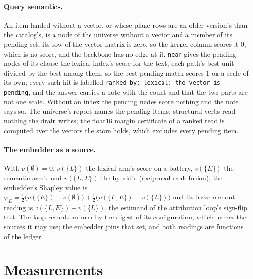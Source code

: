 \documentclass[11pt]{article}
\theoremstyle{plain}
\theoremstyle{definition}
\theoremstyle{remark}
\newcommand{\code}[1]{\texttt{#1}}
\begin{document}
\paragraph{Query semantics.} An item landed without a vector, or whose plane rows are an older
version's than the catalog's, is a node of the universe without a vector and a member of its
pending set; its row of the vector matrix is zero, so the kernel column scores it 0, which is no
score, and the backbone has no edge at it. \code{near} gives the pending nodes of its clause the
lexical index's score for the text, each path's best unit divided by the best among them, so the
best pending match scores 1 on a scale of its own; every such hit is labelled
\code{ranked\_by: lexical: the vector is pending}, and the answer carries a note with the count and
that the two parts are not one scale. Without an index the pending nodes score nothing and the
note says so. The universe's report names the pending items; structural verbs read nothing the
drain writes; the float16 margin certificate of a ranked read is computed over the vectors the
store holds, which excludes every pending item.

\paragraph{The embedder as a source.} With $v(\emptyset) = 0$, $v(\{L\})$ the lexical arm's score
on a battery, $v(\{E\})$ the semantic arm's and $v(\{L, E\})$ the hybrid's (reciprocal rank fusion),
the embedder's Shapley value is
$\varphi_E = \tfrac12\bigl(v(\{E\}) - v(\emptyset)\bigr) + \tfrac12\bigl(v(\{L, E\}) - v(\{L\})\bigr)$
and its leave-one-out reading is $v(\{L, E\}) - v(\{L\})$, the estimand of the attribution loop's
sign-flip test. The loop records an arm by the digest of its configuration, which names the sources
it may use; the embedder joins that set, and both readings are functions of the ledger.

\section{Measurements}\label{sec:eval}
\end{document}
